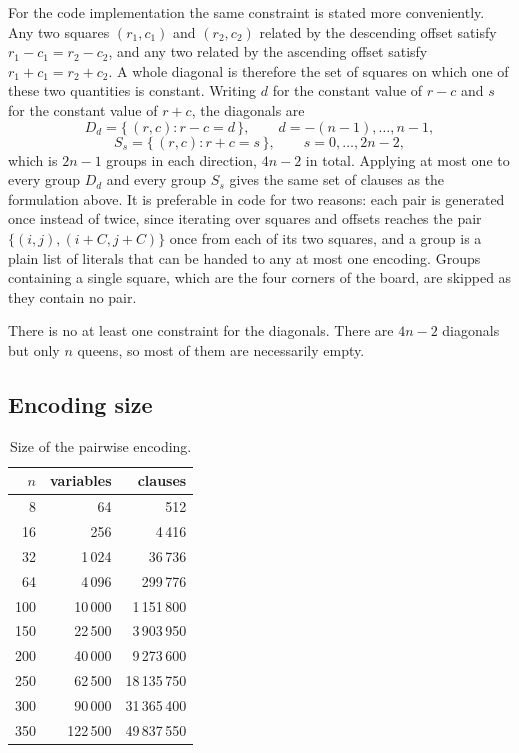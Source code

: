 \documentclass[11pt,a4paper]{article}
\begin{document}
For the code implementation the same constraint is stated more conveniently.
Any two squares $(r_1,c_1)$ and $(r_2,c_2)$ related by the descending offset
satisfy $r_1 - c_1 = r_2 - c_2$, and any two related by the ascending offset
satisfy $r_1 + c_1 = r_2 + c_2$. A whole diagonal is therefore the set of
squares on which one of these two quantities is constant. Writing $d$ for
the constant value of $r-c$ and $s$ for the constant value of $r+c$, the
diagonals are
\[
  D_d = \{\, (r,c) : r - c = d \,\},
  \qquad d = -(n-1), \dots, n-1,
\]
\[
  S_s = \{\, (r,c) : r + c = s \,\},
  \qquad s = 0, \dots, 2n-2,
\]
which is $2n-1$ groups in each direction, $4n-2$ in total. Applying at most
one to every group $D_d$ and every group $S_s$ gives the same set of clauses
as the formulation above. It is preferable in code for two reasons: each
pair is generated once instead of twice, since iterating over squares and
offsets reaches the pair $\{(i,j), (i+C,j+C)\}$ once from each of its two
squares, and a group is a plain list of literals that can be handed to any
at most one encoding. Groups containing a single square, which are the four
corners of the board, are skipped as they contain no pair.

There is no at least one constraint for the diagonals. There are $4n-2$
diagonals but only $n$ queens, so most of them are necessarily empty.

\subsection*{Encoding size}

\begin{table}[H]
\centering
\begin{tabular}{rrr}
\toprule
$n$ & variables & clauses \\
\midrule
8   & 64     & 512 \\
16  & 256    & 4\,416 \\
32  & 1\,024 & 36\,736 \\
64  & 4\,096 & 299\,776 \\
100 & 10\,000 & 1\,151\,800 \\
150 & 22\,500 & 3\,903\,950 \\
200 & 40\,000 & 9\,273\,600 \\
250 & 62\,500 & 18\,135\,750 \\
300 & 90\,000 & 31\,365\,400 \\
350 & 122\,500 & 49\,837\,550 \\
\bottomrule
\end{tabular}
\caption{Size of the pairwise encoding.}
\label{tab:size}
\end{table}
\end{document}
